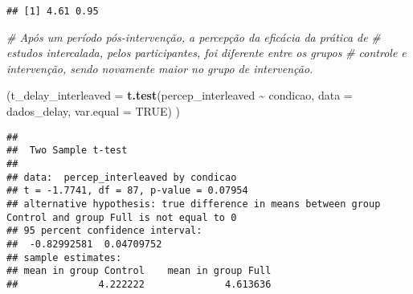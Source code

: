 \documentclass[
]{article}
\newenvironment{Shaded}{\begin{snugshade}}{\end{snugshade}}
\newcommand{\AttributeTok}[1]{\textcolor[rgb]{0.13,0.29,0.53}{#1}}
\newcommand{\CommentTok}[1]{\textcolor[rgb]{0.56,0.35,0.01}{\textit{#1}}}
\newcommand{\ConstantTok}[1]{\textcolor[rgb]{0.56,0.35,0.01}{#1}}
\newcommand{\DecValTok}[1]{\textcolor[rgb]{0.00,0.00,0.81}{#1}}
\newcommand{\FunctionTok}[1]{\textcolor[rgb]{0.13,0.29,0.53}{\textbf{#1}}}
\newcommand{\NormalTok}[1]{#1}
\newcommand{\OtherTok}[1]{\textcolor[rgb]{0.56,0.35,0.01}{#1}}
\newcommand{\SpecialCharTok}[1]{\textcolor[rgb]{0.81,0.36,0.00}{\textbf{#1}}}
\newcommand{\StringTok}[1]{\textcolor[rgb]{0.31,0.60,0.02}{#1}}
\begin{document}
\begin{Shaded}
\end{Shaded}

\begin{verbatim}
## [1] 4.61 0.95
\end{verbatim}

\begin{Shaded}
\begin{Highlighting}[]
\CommentTok{\# Após um período pós{-}intervenção, a percepção da eficácia da prática de}
\CommentTok{\# estudos intercalada, pelos participantes, foi diferente entre os grupos}
\CommentTok{\# controle e intervenção, sendo novamente maior no grupo de intervenção.}

\NormalTok{(}\AttributeTok{t\_delay\_interleaved =} \FunctionTok{t.test}\NormalTok{(percep\_interleaved }\SpecialCharTok{\textasciitilde{}}\NormalTok{ condicao,}
                              \AttributeTok{data =}\NormalTok{ dados\_delay, }\AttributeTok{var.equal =} \ConstantTok{TRUE}\NormalTok{) )}
\end{Highlighting}
\end{Shaded}

\begin{verbatim}
## 
##  Two Sample t-test
## 
## data:  percep_interleaved by condicao
## t = -1.7741, df = 87, p-value = 0.07954
## alternative hypothesis: true difference in means between group Control and group Full is not equal to 0
## 95 percent confidence interval:
##  -0.82992581  0.04709752
## sample estimates:
## mean in group Control    mean in group Full 
##              4.222222              4.613636
\end{verbatim}
\end{document}

